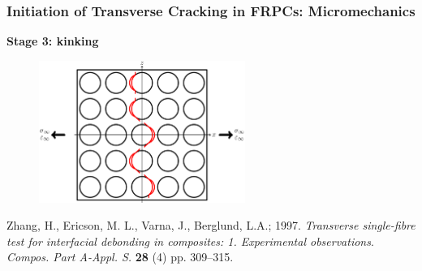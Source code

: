 \documentclass[first,firstsupp,lastsupp,last,hyperref,table]{ETHclass}
\begin{document}
\begin{frame}
\frametitle{\vspace{0.2cm}\small Initiation of Transverse Cracking in FRPCs: Micromechanics}
\vspace{-0.5cm}
\centering
\begin{alertblock}{\centering\scriptsize\bf Stage 3: kinking}
\vspace{-0.25cm}
\begin{figure}
\centering
\includegraphics[width=0.6\textwidth]{stage3-kinking.pdf}
\end{figure}
\end{alertblock}
\vspace{-0.5cm}
{\tiny Zhang, H., Ericson, M. L., Varna, J., Berglund, L.A.; 1997. {\em\tiny Transverse single-fibre test for interfacial debonding in composites: 1. Experimental observations}. {\it\tiny Compos. Part A-Appl. S.} {\bf\tiny 28} (4) pp. 309--315.}
\end{frame}

\addtocounter{framenumber}{-1}
\end{document}
